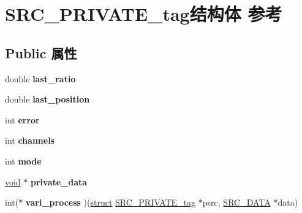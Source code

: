 \hypertarget{struct_s_r_c___p_r_i_v_a_t_e__tag}{}\section{S\+R\+C\+\_\+\+P\+R\+I\+V\+A\+T\+E\+\_\+tag结构体 参考}
\label{struct_s_r_c___p_r_i_v_a_t_e__tag}
\subsection*{Public 属性}
\begin{DoxyCompactItemize}
\item 
\mbox{\label{struct_s_r_c___p_r_i_v_a_t_e__tag_a71e4bdb7cd2c35fd0895dade14077e6d}} 
double {\bfseries last\+\_\+ratio}
\item 
\mbox{\label{struct_s_r_c___p_r_i_v_a_t_e__tag_a10ccd6a1340e514d54da30a7998585a2}} 
double {\bfseries last\+\_\+position}
\item 
\mbox{\label{struct_s_r_c___p_r_i_v_a_t_e__tag_ae55eb429609e3fb9bd559f0e086717ce}} 
int {\bfseries error}
\item 
\mbox{\label{struct_s_r_c___p_r_i_v_a_t_e__tag_ac7715580fb50e8d4ab5d8b0461cdf142}} 
int {\bfseries channels}
\item 
\mbox{\label{struct_s_r_c___p_r_i_v_a_t_e__tag_abc5f0ce591dd69f13d85fad5a37c7680}} 
int {\bfseries mode}
\item 
\mbox{\label{struct_s_r_c___p_r_i_v_a_t_e__tag_acb63a826e7a4e9f952eebcc83e9eb1e2}} 
\hyperlink{interfacevoid}{void} $\ast$ {\bfseries private\+\_\+data}
\item 
\mbox{\label{struct_s_r_c___p_r_i_v_a_t_e__tag_a50a66aa3d2af6413e2d57c79d47c0a6a}} 
int($\ast$ {\bfseries vari\+\_\+process} )(\hyperlink{interfacestruct}{struct} \hyperlink{struct_s_r_c___p_r_i_v_a_t_e__tag}{S\+R\+C\+\_\+\+P\+R\+I\+V\+A\+T\+E\+\_\+tag} $\ast$psrc, \hyperlink{struct_s_r_c___d_a_t_a}{S\+R\+C\+\_\+\+D\+A\+TA} $\ast$data)

\end{DoxyCompactItemize}
